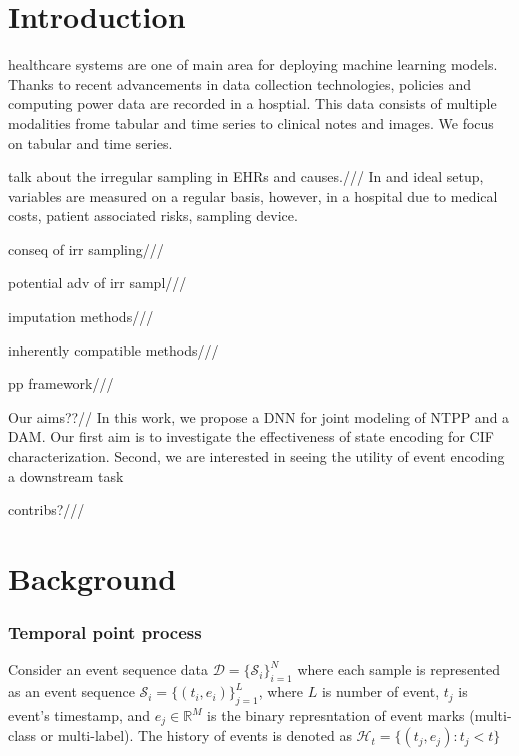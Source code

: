 \documentclass[journal,twoside,web]{ieeecolor}
\begin{document}
\section{Introduction}
\label{sec:intro}



healthcare systems are one of main area for deploying machine learning models. Thanks to recent advancements in data collection technologies, policies and computing power data are recorded in a hosptial. This data consists of multiple modalities frome tabular and time series to clinical notes and images. We focus on tabular and time series.


talk about the irregular sampling in EHRs and causes.///
In and ideal setup, variables are measured on a regular basis, however, in a hospital due to medical costs, patient associated risks, sampling device.

conseq of irr sampling///

potential adv of irr sampl///

imputation methods///

inherently compatible methods///


pp framework///

Our aims??// In this work, we propose a DNN for joint modeling of NTPP and a DAM. Our first aim is to investigate the effectiveness of state encoding for CIF characterization. Second, we are interested in seeing the utility of event encoding a downstream task

contribs?/// 







\section{Background}
\label{sec:Background}










\subsubsection{Temporal point process}
Consider an event sequence data  $\mathcal{D}=\{\mathcal{S}_{i}\}_{i=1}^N$ where each sample is represented as an event sequence  $\mathcal{S}_{i}=\{(t_i,e_i)\}_{j=1}^L$, where $L$ is number of event, $t_j$ is event's timestamp, and $e_j \in \mathbb{R}^M $ is the binary represntation of event marks (multi-class or multi-label). The history of events is denoted as $\mathcal{H}_t=\{(t_j,e_j):t_j<t \} $
\end{document}
